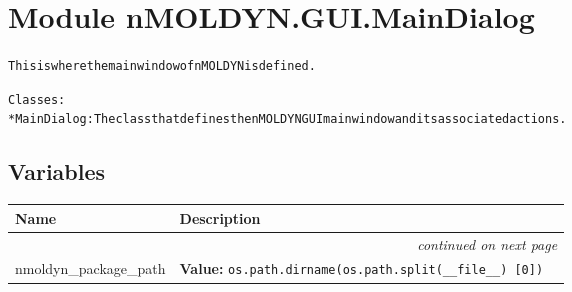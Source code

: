 %
%
%


\section{Module nMOLDYN.GUI.MainDialog}

    \label{nMOLDYN:GUI:MainDialog}
\begin{alltt}
This is where the main window of nMOLDYN is defined.

Classes:
    * MainDialog: The class that defines the nMOLDYN GUI main window and its associated actions.
\end{alltt}



  \subsection{Variables}

    \vspace{-1cm}
\hspace{\varindent}\begin{longtable}{|p{\varnamewidth}|p{\vardescrwidth}|l}
\cline{1-2}
\cline{1-2} \centering \textbf{Name} & \centering \textbf{Description}& \\
\cline{1-2}
\endhead\cline{1-2}\multicolumn{3}{r}{\small\textit{continued on next page}}\\\endfoot\cline{1-2}
\endlastfoot\raggedright n\-m\-o\-l\-d\-y\-n\-\_\-p\-a\-c\-k\-a\-g\-e\-\_\-p\-a\-t\-h\- & \raggedright \textbf{Value:} 
{\tt os.path.dirname(os.path.split(\_\_file\_\_) [0])}&\\
\cline{1-2}
\end{longtable}



